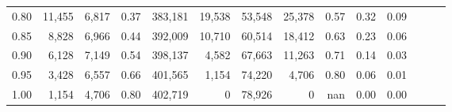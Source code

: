 \begin{tabular}{rrrrrrrrrrrrrr}
0.80 &  11,455 &  6,817 &  0.37 &  383,181 &   19,538 &  53,548 &  25,378 &  0.57 &  0.32 &      0.09 \\
0.85 &   8,828 &  6,966 &  0.44 &  392,009 &   10,710 &  60,514 &  18,412 &  0.63 &  0.23 &      0.06 \\
0.90 &   6,128 &  7,149 &  0.54 &  398,137 &    4,582 &  67,663 &  11,263 &  0.71 &  0.14 &      0.03 \\
0.95 &   3,428 &  6,557 &  0.66 &  401,565 &    1,154 &  74,220 &   4,706 &  0.80 &  0.06 &      0.01 \\
1.00 &   1,154 &  4,706 &  0.80 &  402,719 &        0 &  78,926 &       0 &   nan &  0.00 &      0.00 \\
\bottomrule
\end{tabular}
